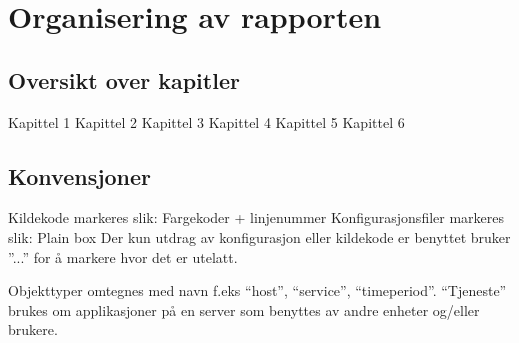 \section{Organisering av rapporten}
\subsection{Oversikt over kapitler}
Kapittel 1
Kapittel 2
Kapittel 3
Kapittel 4
Kapittel 5
Kapittel 6
\subsection{Konvensjoner} %
Kildekode markeres slik:
Fargekoder + linjenummer
Konfigurasjonsfiler markeres slik:
Plain box
Der kun utdrag av konfigurasjon eller kildekode er benyttet bruker ''...'' for å markere hvor det er utelatt.

Objekttyper omtegnes med navn f.eks ``host'', ``service'', ``timeperiod''. ``Tjeneste'' brukes om applikasjoner på en server som benyttes av andre enheter og/eller brukere. 
